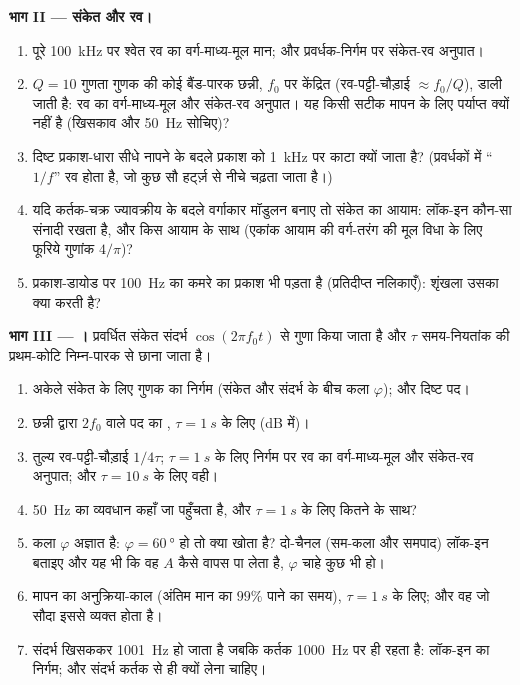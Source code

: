 \begin{problem}[{सप्ताहांत समस्या --- संदर्भ दोलित्र से अंकीकृत परिणाम
तक: एक मिलीवोल्ट रव के नीचे दबे दस माइक्रोवोल्ट के प्रकाश-संकेत को
नापना}]
\medskip
\noindent\textbf{भाग II --- संकेत और रव।}
\begin{enumerate}[resume]
  \item पूरे \qty{100}{kHz} पर श्वेत रव का वर्ग-माध्य-मूल मान;
        और प्रवर्धक-निर्गम पर संकेत-रव अनुपात।
  \item $Q = 10$ गुणता गुणक की कोई बैंड-पारक छन्नी, $f_0$ पर केंद्रित
        (रव-पट्टी-चौड़ाई $\approx f_0/Q$), डाली जाती है: रव का वर्ग-माध्य-मूल और संकेत-रव अनुपात।
        यह किसी सटीक मापन के लिए पर्याप्त क्यों नहीं है (खिसकाव और
        \qty{50}{Hz} सोचिए)?
  \item दिष्ट प्रकाश-धारा सीधे नापने के बदले प्रकाश को \qty{1}{kHz} पर
        काटा क्यों जाता है? (प्रवर्धकों में ``$1/f$'' रव होता है, जो
        कुछ सौ हर्ट्ज़ से नीचे चढ़ता जाता है।)
  \item यदि कर्तक-चक्र ज्यावक्रीय के बदले वर्गाकार मॉडुलन बनाए तो
        संकेत का आयाम: लॉक-इन कौन-सा संनादी रखता है, और
        किस आयाम के साथ (एकांक आयाम की वर्ग-तरंग की मूल विधा के लिए फूरिये गुणांक $4/\pi$)?
  \item प्रकाश-डायोड पर \qty{100}{Hz} का कमरे का प्रकाश भी पड़ता है
        (प्रतिदीप्त नलिकाएँ): शृंखला उसका क्या करती है?
\end{enumerate}

\medskip
\noindent\textbf{भाग III --- ।}
प्रवर्धित संकेत संदर्भ $\cos(2\pi f_0t)$ से गुणा किया जाता है
और $\tau$ समय-नियतांक की प्रथम-कोटि निम्न-पारक से छाना जाता है।
\begin{enumerate}[resume]
  \item अकेले संकेत के लिए गुणक का निर्गम (संकेत और संदर्भ के बीच
        कला $\varphi$); और दिष्ट पद।
  \item छन्नी द्वारा $2f_0$ वाले पद का , $\tau = \qty{1}{s}$ के लिए
        (dB में)।
  \item तुल्य रव-पट्टी-चौड़ाई $1/4\tau$; $\tau = \qty{1}{s}$ के लिए निर्गम पर
        रव का वर्ग-माध्य-मूल और संकेत-रव अनुपात; और $\tau = \qty{10}{s}$ के लिए वही।
  \item \qty{50}{Hz} का व्यवधान कहाँ जा पहुँचता है, और $\tau = \qty{1}{s}$ के लिए
        कितने  के साथ?
  \item कला $\varphi$ अज्ञात है: $\varphi = \qty{60}{\degree}$ हो तो क्या खोता है?
        दो-चैनल (सम-कला और समपाद) लॉक-इन बताइए और यह भी कि
        वह $A$ कैसे वापस पा लेता है, $\varphi$ चाहे कुछ भी हो।
  \item मापन का अनुक्रिया-काल (अंतिम मान का $99\%$ पाने का समय),
        $\tau = \qty{1}{s}$ के लिए; और वह जो सौदा इससे व्यक्त होता है।
  \item संदर्भ खिसककर \qty{1001}{Hz} हो जाता है जबकि कर्तक
        \qty{1000}{Hz} पर ही रहता है: लॉक-इन का निर्गम; और संदर्भ कर्तक से ही
        क्यों लेना चाहिए।
\end{enumerate}


\end{problem}

